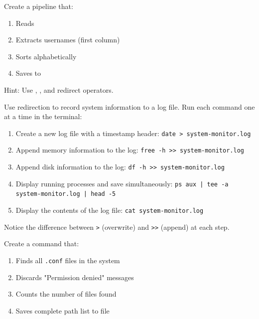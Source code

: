 \begin{exercisebox}[3.2]
	Create a pipeline that:
	\begin{enumerate}
		\item Reads 
		\item Extracts usernames (first column)
		\item Sorts alphabetically
		\item Saves to 
	\end{enumerate}

	Hint: Use , , and redirect operators.
\end{exercisebox}

\begin{exercisebox}[3.3]
	Use redirection to record system information to a log file. Run each command one at a time in the terminal:
	\begin{enumerate}
		\item Create a new log file with a timestamp header: \texttt{date > system-monitor.log}
		\item Append memory information to the log: \texttt{free -h >> system-monitor.log}
		\item Append disk information to the log: \texttt{df -h >> system-monitor.log}
		\item Display running processes and save simultaneously: \texttt{ps aux | tee -a system-monitor.log | head -5}
		\item Display the contents of the log file: \texttt{cat system-monitor.log}
	\end{enumerate}

	Notice the difference between \texttt{>} (overwrite) and \texttt{>>} (append) at each step.
\end{exercisebox}

\begin{exercisebox}[3.4]
	Create a command that:
	\begin{enumerate}
		\item Finds all \texttt{.conf} files in the system
		\item Discards "Permission denied" messages
		\item Counts the number of files found
		\item Saves complete path list to file
	\end{enumerate}
\end{exercisebox}


